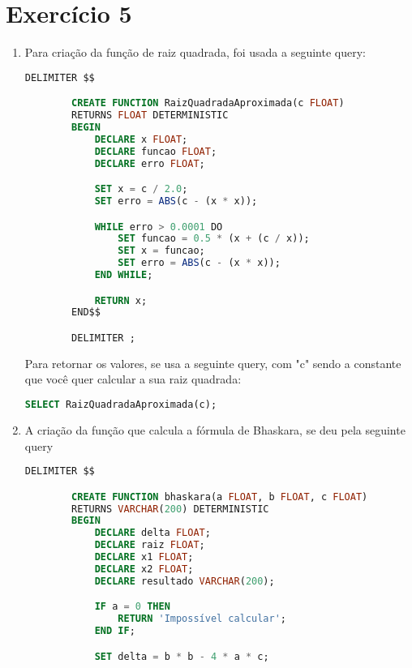 \documentclass{article}
\begin{document}
\section*{Exercício 5}
\begin{enumerate}[label=\alph*)]

    \item Para criação da função de raiz quadrada, foi usada a seguinte query:
    \begin{lstlisting}[language=SQL]
        DELIMITER $$

        CREATE FUNCTION RaizQuadradaAproximada(c FLOAT)
        RETURNS FLOAT DETERMINISTIC
        BEGIN
            DECLARE x FLOAT;
            DECLARE funcao FLOAT;
            DECLARE erro FLOAT;

            SET x = c / 2.0;
            SET erro = ABS(c - (x * x));

            WHILE erro > 0.0001 DO
                SET funcao = 0.5 * (x + (c / x));
                SET x = funcao;
                SET erro = ABS(c - (x * x));
            END WHILE;

            RETURN x;
        END$$

        DELIMITER ;
    \end{lstlisting}

    Para retornar os valores, se usa a seguinte query, com "c" sendo a constante que você quer calcular a sua raiz quadrada:
    
    \begin{lstlisting}[language=SQL]
        SELECT RaizQuadradaAproximada(c);
    \end{lstlisting}
    
    \item A criação da função que calcula a fórmula de Bhaskara, se deu pela seguinte query

    \begin{lstlisting}[language=SQL]
        DELIMITER $$

        CREATE FUNCTION bhaskara(a FLOAT, b FLOAT, c FLOAT)
        RETURNS VARCHAR(200) DETERMINISTIC
        BEGIN
            DECLARE delta FLOAT;
            DECLARE raiz FLOAT;
            DECLARE x1 FLOAT;
            DECLARE x2 FLOAT;
            DECLARE resultado VARCHAR(200);

            IF a = 0 THEN
                RETURN 'Impossível calcular';
            END IF;

            SET delta = b * b - 4 * a * c;


\end{lstlisting}
\end{enumerate}
\end{document}

